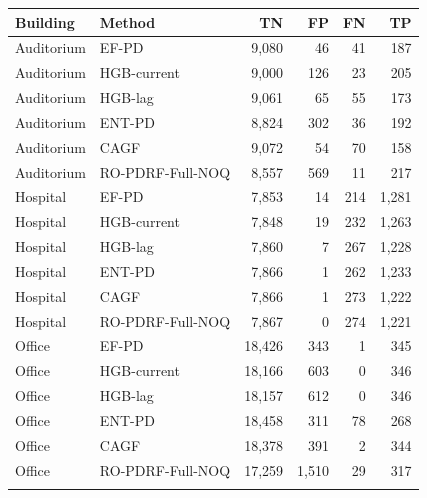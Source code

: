 \begin{tabular}{llrrrr}
\toprule
Building & Method & TN & FP & FN & TP \\
\midrule
Auditorium & EF-PD & 9,080 & 46 & 41 & 187 \\
Auditorium & HGB-current & 9,000 & 126 & 23 & 205 \\
Auditorium & HGB-lag & 9,061 & 65 & 55 & 173 \\
Auditorium & ENT-PD & 8,824 & 302 & 36 & 192 \\
Auditorium & CAGF & 9,072 & 54 & 70 & 158 \\
Auditorium & RO-PDRF-Full-NOQ & 8,557 & 569 & 11 & 217 \\
\addlinespace
Hospital & EF-PD & 7,853 & 14 & 214 & 1,281 \\
Hospital & HGB-current & 7,848 & 19 & 232 & 1,263 \\
Hospital & HGB-lag & 7,860 & 7 & 267 & 1,228 \\
Hospital & ENT-PD & 7,866 & 1 & 262 & 1,233 \\
Hospital & CAGF & 7,866 & 1 & 273 & 1,222 \\
Hospital & RO-PDRF-Full-NOQ & 7,867 & 0 & 274 & 1,221 \\
\addlinespace
Office & EF-PD & 18,426 & 343 & 1 & 345 \\
Office & HGB-current & 18,166 & 603 & 0 & 346 \\
Office & HGB-lag & 18,157 & 612 & 0 & 346 \\
Office & ENT-PD & 18,458 & 311 & 78 & 268 \\
Office & CAGF & 18,378 & 391 & 2 & 344 \\
Office & RO-PDRF-Full-NOQ & 17,259 & 1,510 & 29 & 317 \\
\addlinespace
\bottomrule
\end{tabular}